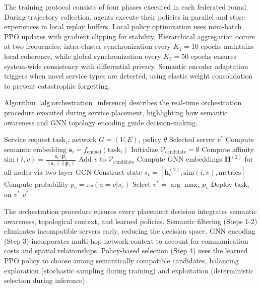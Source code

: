 \documentclass[conference]{IEEEtran}
\begin{document}
		The training protocol consists of four phases executed in each federated round. During trajectory collection, agents execute their policies in parallel and store experiences in local replay buffers. Local policy optimization uses mini-batch PPO updates with gradient clipping for stability. Hierarchical aggregation occurs at two frequencies: intra-cluster synchronization every $K_1=10$ epochs maintains local coherence, while global synchronization every $K_2=50$ epochs ensures system-wide consistency with differential privacy. Semantic encoder adaptation triggers when novel service types are detected, using elastic weight consolidation to prevent catastrophic forgetting.
		
		Algorithm~\ref{alg:orchestration_inference} describes the real-time orchestration procedure executed during service placement, highlighting how semantic awareness and GNN topology encoding guide decision-making.
		
		\begin{algorithm}[t]
			\caption{FedSemGNN Orchestration (Inference)}
			\label{alg:orchestration_inference}
			\begin{algorithmic}[1]
				\REQUIRE Service request $\text{task}_i$, network $G=(V,E)$, policy $\theta$
				\ENSURE Selected server $v^*$
				\STATE Compute semantic embedding $\mathbf{s}_i = f_{\text{embed}}(\text{task}_i)$
				\STATE Initialize $\mathcal{V}_{\text{candidate}} = \emptyset$
				\STATE Compute affinity $\text{sim}(i,v) = \frac{\mathbf{s}_i \cdot \mathbf{p}_v}{\|\mathbf{s}_i\| \|\mathbf{p}_v\|}$
				\STATE Add $v$ to $\mathcal{V}_{\text{candidate}}$
				\ENDIF
				\ENDFOR
				\STATE
				\STATE Compute GNN embeddings $\mathbf{H}^{(2)}$ for all nodes via two-layer GCN
				\STATE Construct state $s_v = [\mathbf{h}_v^{(2)}, \text{sim}(i,v), \text{metrics}]$
				\STATE Compute probability $p_v = \pi_\theta(a=v | s_v)$
				\ENDFOR
				\STATE
				\STATE Select $v^* = \arg\max_v p_v$
				\STATE Deploy $\text{task}_i$ on $v^*$
				\RETURN $v^*$
			\end{algorithmic}
		\end{algorithm}
		
		The orchestration procedure ensures every placement decision integrates semantic awareness, topological context, and learned policies. Semantic filtering (Steps 1-2) eliminates incompatible servers early, reducing the decision space. GNN encoding (Step 3) incorporates multi-hop network context to account for communication costs and spatial relationships. Policy-based selection (Step 4) uses the learned PPO policy to choose among semantically compatible candidates, balancing exploration (stochastic sampling during training) and exploitation (deterministic selection during inference).
		
\end{document}
